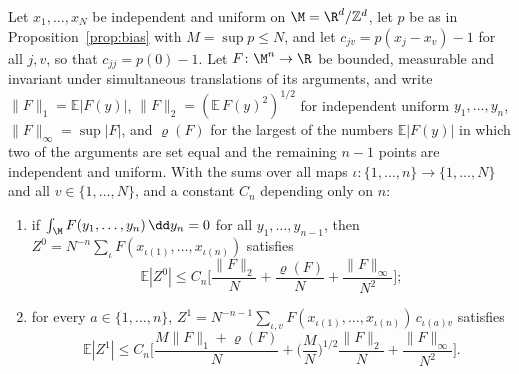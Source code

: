 \begin{lemma}\label{lem:degenerate}
Let $x_1,\dots,x_N$ be independent and uniform on $\M=\R^d/\mathbb Z^d$, let $p$ be as in Proposition~\ref{prop:bias} with $M=\sup p\le N$, and let $c_{jv}=p(x_j-x_v)-1$ for all $j,v$, so that $c_{jj}=p(0)-1$. Let $F\colon\M^n\to\R$ be bounded, measurable and invariant under simultaneous translations of its arguments, and write $\|F\|_1=\mathbb E|F(y)|$, $\|F\|_2=(\mathbb E\,F(y)^2)^{1/2}$ for independent uniform $y_1,\dots,y_n$, $\|F\|_\infty=\sup|F|$, and $\varrho(F)$ for the largest of the numbers $\mathbb E|F(y)|$ in which two of the arguments are set equal and the remaining $n-1$ points are independent and uniform. With the sums over all maps $\iota\colon\{1,\dots,n\}\to\{1,\dots,N\}$ and all $v\in\{1,\dots,N\}$, and a constant $C_n$ depending only on $n$:
\begin{enumerate}[label=\textup{(\alph*)}]
\item if $\int_\M F(y_1,\dots,y_n)\,\dd y_n=0$ for all $y_1,\dots,y_{n-1}$, then $Z^0=N^{-n}\sum_\iota F(x_{\iota(1)},\dots,x_{\iota(n)})$ satisfies
\[
\mathbb E|Z^0|\le C_n\Big[\frac{\|F\|_2}N+\frac{\varrho(F)}N+\frac{\|F\|_\infty}{N^2}\Big];
\]
\item for every $a\in\{1,\dots,n\}$, $Z^1=N^{-n-1}\sum_{\iota,v}F(x_{\iota(1)},\dots,x_{\iota(n)})\,c_{\iota(a)v}$ satisfies
\[
\mathbb E|Z^1|\le C_n\Big[\frac{M\|F\|_1+\varrho(F)}N+\Big(\frac MN\Big)^{1/2}\frac{\|F\|_2}N+\frac{\|F\|_\infty}{N^2}\Big].
\]
\end{enumerate}
\end{lemma}

